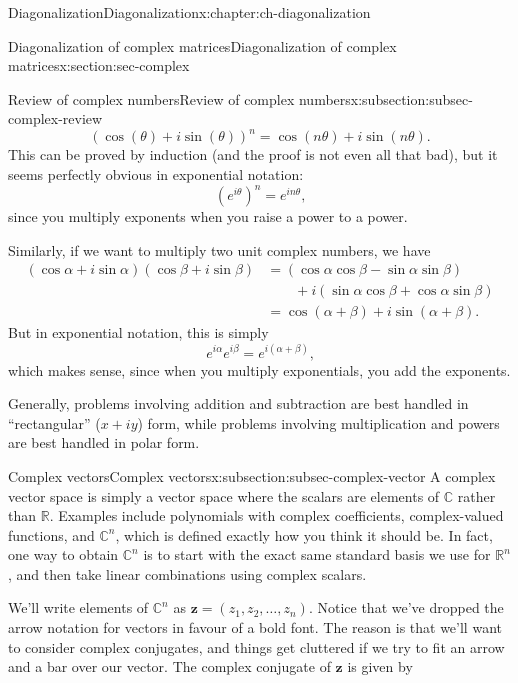 \documentclass[oneside,10pt,]{book}
\numberwithin{equation}{section}
\newcommand{\R}{\mathbb{R}}
\newcommand{\C}{\mathbb{C}}
\newcommand{\zz}{\mathbf{z}}
\newcommand{\amp}{&}
\begin{document}
\begin{chapterptx}{Diagonalization}{}{Diagonalization}{}{}{x:chapter:ch-diagonalization}
\begin{sectionptx}{Diagonalization of complex matrices}{}{Diagonalization of complex matrices}{}{}{x:section:sec-complex}
\begin{subsectionptx}{Review of complex numbers}{}{Review of complex numbers}{}{}{x:subsection:subsec-complex-review}
\begin{equation*}
(\cos(\theta)+i\sin(\theta))^n = \cos(n\theta)+i\sin(n\theta)\text{.}
\end{equation*}
This can be proved by induction (and the proof is not even all that bad), but it seems perfectly obvious in exponential notation:%
\begin{equation*}
(e^{i\theta})^n = e^{in\theta}\text{,}
\end{equation*}
since you multiply exponents when you raise a power to a power.%
\par
Similarly, if we want to multiply two unit complex numbers, we have%
\begin{align*}
(\cos\alpha+i\sin\alpha)(\cos\beta+i\sin\beta) \amp = (\cos\alpha\cos\beta-\sin\alpha\sin\beta)\\
\amp \quad\quad +i(\sin\alpha\cos\beta+\cos\alpha\sin\beta)\\
\amp = \cos(\alpha+\beta)+i\sin(\alpha+\beta)\text{.}
\end{align*}
But in exponential notation, this is simply%
\begin{equation*}
e^{i\alpha}e^{i\beta} = e^{i(\alpha+\beta)}\text{,}
\end{equation*}
which makes sense, since when you multiply exponentials, you add the exponents.%
\par
Generally, problems involving addition and subtraction are best handled in ``rectangular'' (\(x+iy\)) form, while problems involving multiplication and powers are best handled in polar form.%
\end{subsectionptx}
%
%
\typeout{************************************************}
\typeout{************************************************}
%
\begin{subsectionptx}{Complex vectors}{}{Complex vectors}{}{}{x:subsection:subsec-complex-vector}
A complex vector space is simply a vector space where the scalars are elements of \(\C\) rather than \(\R\). Examples include polynomials with complex coefficients, complex-valued functions, and \(\C^n\), which is defined exactly how you think it should be. In fact, one way to obtain \(\C^n\) is to start with the exact same standard basis we use for \(\R^n\), and then take linear combinations using complex scalars.%
\par
We'll write elements of \(\C^n\) as \(\zz = (z_1,z_2,\ldots, z_n)\). Notice that we've dropped the arrow notation for vectors in favour of a bold font. The reason is that we'll want to consider complex conjugates, and things get cluttered if we try to fit an arrow and a bar over our vector. The complex conjugate of \(\zz\) is given by%

\end{subsectionptx}
\end{sectionptx}
\end{chapterptx}
\end{document}
